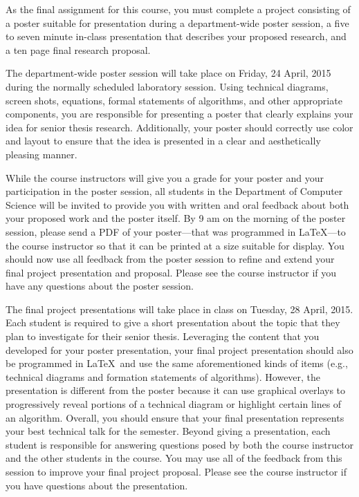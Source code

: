 
\usepackage{ulem}
\usepackage[compact]{titlesec}




As the final assignment for this course, you must complete a project consisting of a poster suitable for presentation
during a department-wide poster session, a five to seven minute in-class presentation that describes your proposed
research, and a ten page final research proposal.


The department-wide poster session will take place on Friday, 24 April, 2015 during the normally scheduled laboratory
session.  Using technical diagrams, screen shots, equations, formal statements of algorithms, and other appropriate
components,  you are responsible for presenting a poster that clearly explains your idea for senior thesis research.
Additionally, your poster should correctly use color and layout to ensure that the idea is presented in a clear and
aesthetically pleasing manner.

While the course instructors will give you a grade for your poster and your participation in the poster session, all
students in the Department of Computer Science will be invited to provide you with written and oral feedback about both
your proposed work and the poster itself.  By 9 am on the morning of the poster session, please send a PDF of your
poster---that was programmed in \LaTeX---to the course instructor so that it can be printed at a size
suitable for display.  You should now use all feedback from the poster session to refine and extend your final project
presentation and proposal. Please see the course instructor if you have any questions about the poster session.


The final project presentations will take place in class on Tuesday, 28 April, 2015. Each student is required to give a
short presentation about the topic that they plan to investigate for their senior thesis.  Leveraging the content that
you developed for your poster presentation, your final project presentation should also be programmed in \LaTeX\ and use
the same aforementioned kinds of items (e.g., technical diagrams and formation statements of algorithms). However, the
presentation is different from the poster because it can use graphical overlays to progressively reveal portions of a
technical diagram or highlight certain lines of an algorithm. Overall, you should ensure that your final presentation
represents your best technical talk for the semester.  Beyond giving a presentation, each student is responsible for
answering questions posed by both the course instructor and the other students in the course.  You may use all of the
feedback from this session to improve your final project proposal. Please see the course instructor if you have
questions about the presentation.

